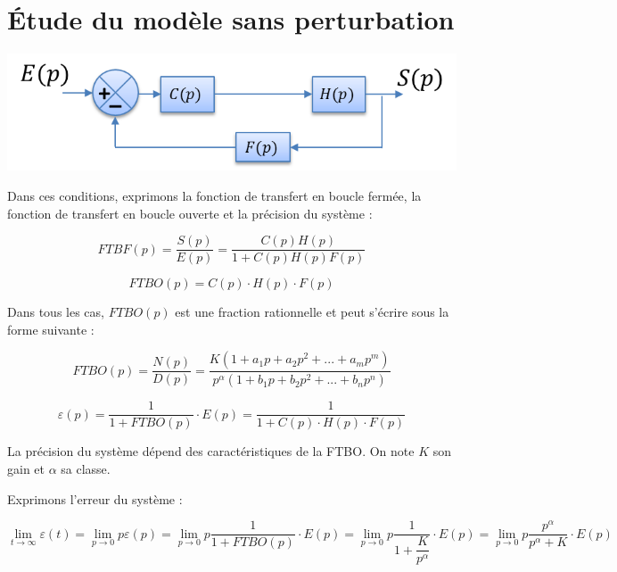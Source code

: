 \documentclass[10pt,fleqn]{article} %
\begin{document}
\section{Étude du modèle sans perturbation}


\begin{minipage}[c]{.48\linewidth}
\begin{center}
\includegraphics[width=.95\textwidth]{images/bloc11}
\end{center}
\end{minipage}\hfill
\begin{minipage}[c]{.48\linewidth}
Dans ces conditions, exprimons la fonction de transfert en boucle fermée, la fonction de transfert en boucle ouverte et la précision du système :

$$
FTBF(p)
=\dfrac{S(p)}{E(p)}
=\dfrac{C(p)H(p)}{1+C(p)H(p)F(p)}
$$

\end{minipage}


$$
FTBO(p) = C(p) \cdot H(p) \cdot F(p)
$$


Dans tous les cas, $FTBO(p)$ est une fraction rationnelle et peut s'écrire sous la forme suivante : 

$$
FTBO(p)=\dfrac{N(p)}{D(p)}=\dfrac{K\left(1+a_1p +a_2p^2 + ... + a_m p^m \right)}{p^\alpha \left(1+b_1p +b_2p^2 + ... + b_n p^n \right)}
$$


$$
\varepsilon(p)
=\dfrac{1}{1+FTBO(p)} \cdot E(p)
=\dfrac{1}{1+C(p) \cdot H(p) \cdot F(p)} 
$$

\begin{rem}
La précision du système dépend des caractéristiques de la FTBO. On note $K$ son gain et $\alpha$ sa classe.
\end{rem}


Exprimons l'erreur du système :

$$
\lim\limits_{t\to \infty} \varepsilon(t) = \lim\limits_{p\to 0} p \varepsilon(p)
= \lim\limits_{p\to 0} p \dfrac{1}{1+FTBO(p)} \cdot E(p)
= \lim\limits_{p\to 0} p \dfrac{1}{1+\dfrac{K}{p^\alpha}} \cdot E(p)
= \lim\limits_{p\to 0} p \dfrac{p^\alpha}{p^\alpha+K} \cdot E(p)
$$
\end{document}
